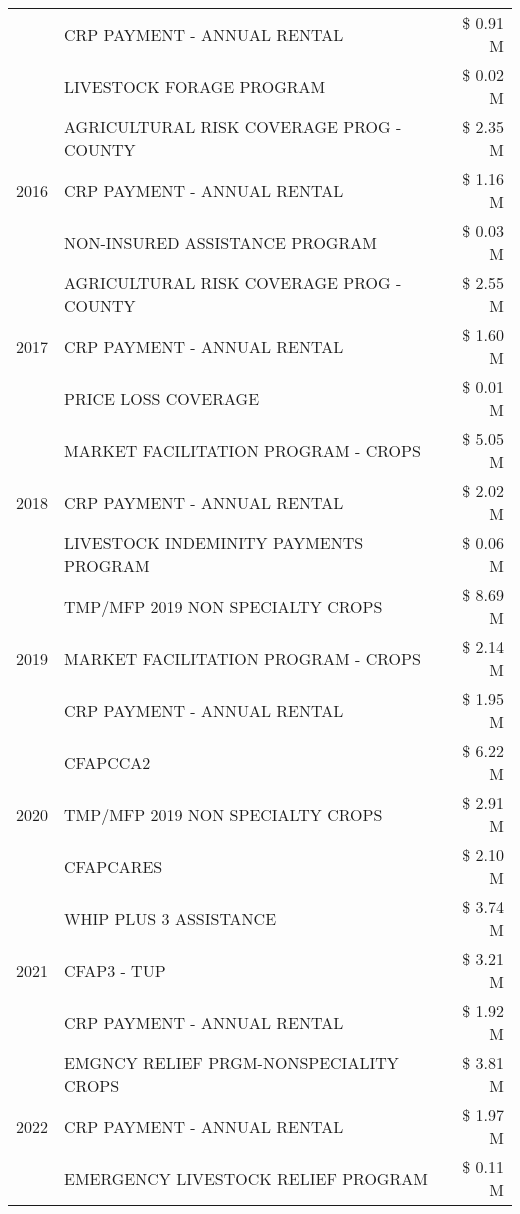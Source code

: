 \begin{tabular}{llr}
 & CRP PAYMENT - ANNUAL RENTAL & \$ 0.91 M \\
 & LIVESTOCK FORAGE PROGRAM & \$ 0.02 M \\
\cline{1-3}
\multirow[t]{3}{*}{2016} & AGRICULTURAL RISK COVERAGE PROG - COUNTY & \$ 2.35 M \\
 & CRP PAYMENT - ANNUAL RENTAL & \$ 1.16 M \\
 & NON-INSURED ASSISTANCE PROGRAM & \$ 0.03 M \\
\cline{1-3}
\multirow[t]{3}{*}{2017} & AGRICULTURAL RISK COVERAGE PROG - COUNTY & \$ 2.55 M \\
 & CRP PAYMENT - ANNUAL RENTAL & \$ 1.60 M \\
 & PRICE LOSS COVERAGE & \$ 0.01 M \\
\cline{1-3}
\multirow[t]{3}{*}{2018} & MARKET FACILITATION PROGRAM - CROPS & \$ 5.05 M \\
 & CRP PAYMENT - ANNUAL RENTAL & \$ 2.02 M \\
 & LIVESTOCK INDEMINITY PAYMENTS PROGRAM & \$ 0.06 M \\
\cline{1-3}
\multirow[t]{3}{*}{2019} & TMP/MFP 2019 NON SPECIALTY CROPS & \$ 8.69 M \\
 & MARKET FACILITATION PROGRAM - CROPS & \$ 2.14 M \\
 & CRP PAYMENT - ANNUAL RENTAL & \$ 1.95 M \\
\cline{1-3}
\multirow[t]{3}{*}{2020} & CFAPCCA2 & \$ 6.22 M \\
 & TMP/MFP 2019 NON SPECIALTY CROPS & \$ 2.91 M \\
 & CFAPCARES & \$ 2.10 M \\
\cline{1-3}
\multirow[t]{3}{*}{2021} & WHIP PLUS 3 ASSISTANCE & \$ 3.74 M \\
 & CFAP3 - TUP & \$ 3.21 M \\
 & CRP PAYMENT - ANNUAL RENTAL & \$ 1.92 M \\
\cline{1-3}
\multirow[t]{3}{*}{2022} & EMGNCY RELIEF PRGM-NONSPECIALITY CROPS & \$ 3.81 M \\
 & CRP PAYMENT - ANNUAL RENTAL & \$ 1.97 M \\
 & EMERGENCY LIVESTOCK RELIEF PROGRAM & \$ 0.11 M \\
\cline{1-3}
\bottomrule
\end{tabular}
